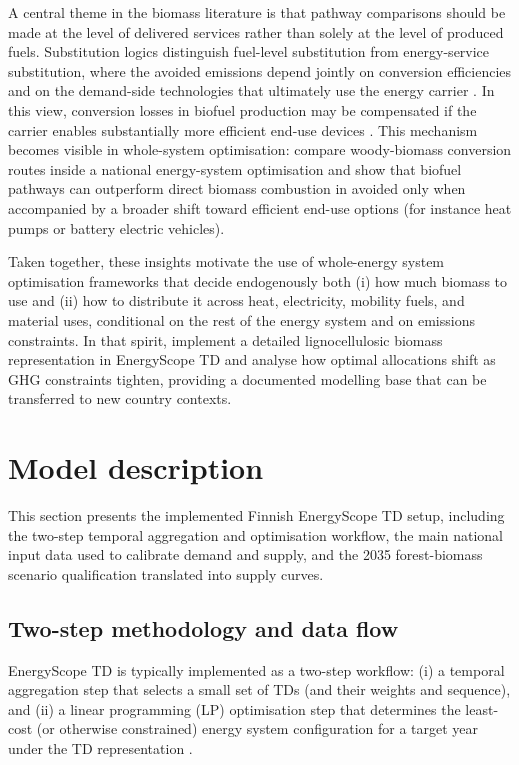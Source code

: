 \documentclass{article}
\begin{document}
A central theme in the biomass literature is that pathway comparisons should be made at the level of delivered services rather than solely at the level of produced fuels. Substitution logics distinguish fuel-level substitution from energy-service substitution, where the avoided emissions depend jointly on conversion efficiencies and on the demand-side technologies that ultimately use the energy carrier \citep{wahlund_increasing_2004}. In this view, conversion losses in biofuel production may be compensated if the carrier enables substantially more efficient end-use devices \citep{steubing_heat_2012}. This mechanism becomes visible in whole-system optimisation: \citet{codina_girones_optimal_2017} compare woody-biomass conversion routes inside a national energy-system optimisation and show that biofuel pathways can outperform direct biomass combustion in avoided  only when accompanied by a broader shift toward efficient end-use options (for instance heat pumps or battery electric vehicles).


Taken together, these insights motivate the use of whole-energy system optimisation frameworks that decide endogenously both (i) how much biomass to use and (ii) how to distribute it across heat, electricity, mobility fuels, and material uses, conditional on the rest of the energy system and on emissions constraints. In that spirit, \citet{collaOptimalUseLignocellulosic2022} implement a detailed lignocellulosic biomass representation in EnergyScope TD and analyse how optimal allocations shift as GHG constraints tighten, providing a documented modelling base that can be transferred to new country contexts.

\section{Model description}
\label{sec:model_description}

This section presents the implemented Finnish EnergyScope TD setup, including the two-step temporal aggregation and optimisation workflow, the main national input data used to calibrate demand and supply, and the 2035 forest-biomass scenario qualification translated into supply curves.

\subsection{Two-step methodology and data flow}
EnergyScope TD is typically implemented as a two-step workflow:
(i) a temporal aggregation step that selects a small set of TDs (and their weights and sequence), and
(ii) a linear programming (LP) optimisation step that determines the least-cost (or otherwise constrained) energy system configuration for a target year under the TD representation \citep{limpensGeneratingEnergyTransition2021}.
\end{document}
